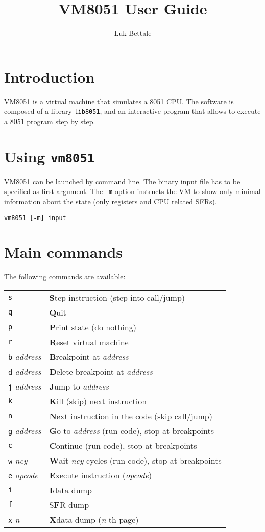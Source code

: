 \documentclass{article}
\title{VM8051 User Guide}
\author{Luk Bettale}
\date{}
\begin{document}
\maketitle

\section*{Introduction}
VM8051 is a virtual machine that simulates a 8051 CPU. The software is
composed of a library \texttt{lib8051}, and an interactive program
that allows to execute a 8051 program step by step.

\section*{Using \texttt{vm8051}}
VM8051 can be launched by command line. The binary input file has to
be specified as first argument. The \texttt{-m} option instructs the
VM to show only minimal information about the state (only registers
and CPU related SFRs).

\begin{verbatim}
vm8051 [-m] input
\end{verbatim}

\section*{Main commands}
The following commands are available:

\begin{tabular}{ll}
  \texttt{s}&\textbf{S}tep instruction (step into call/jump)\\
  \texttt{q}&\textbf{Q}uit\\
  \texttt{p}&\textbf{P}rint state (do nothing)\\
  \texttt{r}&\textbf{R}eset virtual machine\\
  \texttt{b} \textit{address}&\textbf{B}reakpoint at \textit{address}\\
  \texttt{d} \textit{address}&\textbf{D}elete breakpoint at \textit{address}\\
  \texttt{j} \textit{address}&\textbf{J}ump to \textit{address}\\
  \texttt{k}&\textbf{K}ill (skip) next instruction\\
  \texttt{n}&\textbf{N}ext instruction in the code (skip call/jump)\\
  \texttt{g} \textit{address}&\textbf{G}o to \textit{address} (run
  code), stop at breakpoints\\
  \texttt{c}&\textbf{C}ontinue (run code), stop at breakpoints\\
  \texttt{w} \textit{ncy}&\textbf{W}ait \textit{ncy} cycles (run code),
  stop at breakpoints\\
  \texttt{e} \textit{opcode}&\textbf{E}xecute instruction (\textit{opcode})\\
  \texttt{i}&\textbf{I}data dump\\
  \texttt{f}&S\textbf{F}R dump\\
  \texttt{x} \textit{n}&\textbf{X}data dump (\textit{n}-th page)
\end{tabular}
\end{document}
